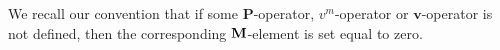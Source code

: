 

\begin{remark}\rm\label{remark operator not defined refinada}  
      We recall our convention that if some $\mathbf{P}$-operator, $v^m$-operator or $\mathbf{v}$-operator is not defined, then the corresponding $\mathbf{M}$-element is set equal to zero. 
\end{remark}

